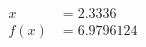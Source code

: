 \documentclass[preview]{standalone}
\begin{document}
\begin{align*}
x &= 2.3336\\f(x) &= 6.9796124
\end{align*}
\end{document}
